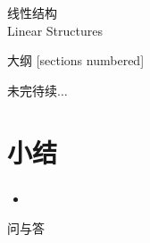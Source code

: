 \begin{standout}[第一章]
    线性结构\\
    Linear Structures
\end{standout}

\begin{frame}{大纲}
    [sections numbered]
    \tableofcontents
\end{frame}



% 

\begin{standout}
    未完待续$\dots$
\end{standout}

\section{小结}

\begin{frame}
    \frametitle{\insertsectionhead}
    \begin{itemize}
        \item 
    \end{itemize}
\end{frame}

\begin{standout}[]
    问与答
\end{standout}